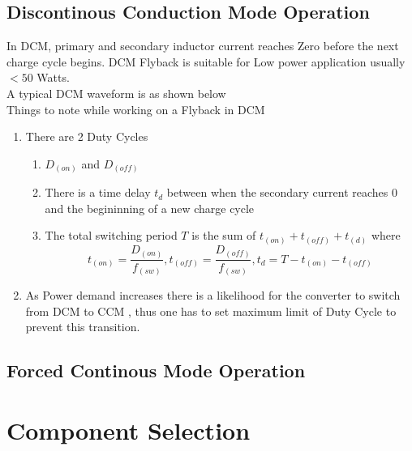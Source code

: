 \documentclass{article}
\begin{document}
\subsection[Discontinous Conduction Mode Operatio]{Discontinous Conduction Mode Operation}
In DCM, primary and secondary inductor current reaches Zero before the next charge cycle begins. DCM Flyback is suitable for Low power application usually $< 50$ Watts.\\A typical DCM waveform is as shown below\\
Things to note while working on a Flyback in DCM\\
\begin{enumerate}
    \item There are 2 Duty Cycles\begin{enumerate}
        \item $D_(on)$ and $D_(off)$
        \item There is a time delay $t_d$ between when the secondary current reaches $0$ and the begininning of a new charge cycle
        \item The total switching period $T$ is the sum of $t_(on) + t_(off) + t_(d)$ where 
        \begin{equation*}
            t_(on) = \frac{D_(on)}{f_(sw)} , t_(off) = \frac{D_(off)}{f_(sw)},t_d = T - t_(on) - t_(off)
        \end{equation*}
    \end{enumerate}
    \item As Power demand increases there is a likelihood for the converter to switch from DCM to CCM , thus one has to set maximum limit of Duty Cycle to prevent this transition.
\end{enumerate}

\subsection[Forced Continous Mode Operation]{Forced Continous Mode Operation}

\section{Component Selection}
\end{document}
